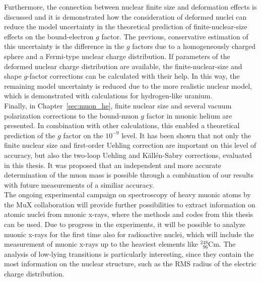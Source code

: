 Furthermore, the connection between nuclear finite size and deformation effects is discussed and it is demonstrated how the consideration of deformed nuclei can reduce the model uncertainty in the theoretical prediction of finite-nuclear-size effects on the bound-electron $g$ factor. The previous, conservative estimation of this uncertainty is the difference in the $g$ factors due to a homogeneously charged sphere and a Fermi-type nuclear charge distribution. If parameters of the deformed nuclear charge distribution are available, the finite-nuclear-size and shape $g$-factor corrections can be calculated with their help. In this way, the remaining model uncertainty is reduced due to the more realistic nuclear model, which is demonstrated with calculations for hydrogen-like uranium.\\[11pt]%
%
Finally, in Chapter~\ref{sec:muon_he}, finite nuclear size and several vacuum polarization corrections to the bound-muon $g$ factor in muonic helium are presented. In combination with other calculations, this enabled a theoretical prediction of the $g$ factor on the $10^{-9}$ level. It has been shown that not only the finite nuclear size and first-order Uehling correction are important on this level of accuracy, but also the two-loop Uehling and Källén-Sabry corrections, evaluated in this thesis. 
It was proposed that an independent and more accurate determination of the muon mass is possible through a combination of our results with future measurements of a similiar accuracy.\\[11pt]%
%
The ongoing experimental campaign on spectroscopy of heavy muonic atoms by the MuX collaboration will provide further possibilities to extract information on atomic nuclei from muonic x-rays, where the methods and codes from this thesis can be used. 
Due to progress in the experiments, it will be possible to analyze muonic x-rays for the first time also for radioactive nuclei, which will include the measurement of muonic x-rays up to the heaviest elements like $_{\phantom{1}96}^{248}$Cm. 
The analysis of low-lying transitions is particularly interesting, since they contain the most information on the nuclear structure, such as the RMS radius of the electric charge distribution.

